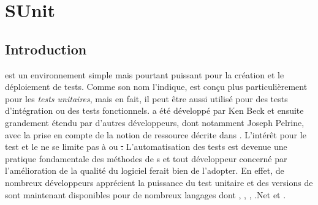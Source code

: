 \documentclass[a4paper,10pt,twoside]{book}
\begin{document}
	\sloppy
\fi
\newcommand{\aconfirmer}[1]{#1}
\chapter{SUnit}

\section{Introduction}


 est un environnement simple mais pourtant puissant 
pour la création et le déploiement de tests.
Comme son nom l'indique, \sunit est conçu plus particulièrement pour les \emph{tests unitaires},
mais en fait, il peut être aussi utilisé pour des tests d'intégration ou des tests fonctionnels. 
\sunit a été développé par Ken Beck et ensuite grandement étendu par d'autres développeurs, dont notamment Joseph Pelrine, avec la prise en compte de la notion de ressource décrite dans . 
L'intérêt pour le test et le  ne se limite pas à \pharo ou \st.
L'automatisation des tests est devenue une pratique fondamentale des méthodes de s et 
tout développeur concerné par l'amélioration de la qualité du logiciel ferait bien de l'adopter.  
En effet, de nombreux développeurs apprécient la puissance du test unitaire et des versions de \xUnit{} sont maintenant disponibles pour de nombreux langages dont , , , .Net et .
\end{document}
